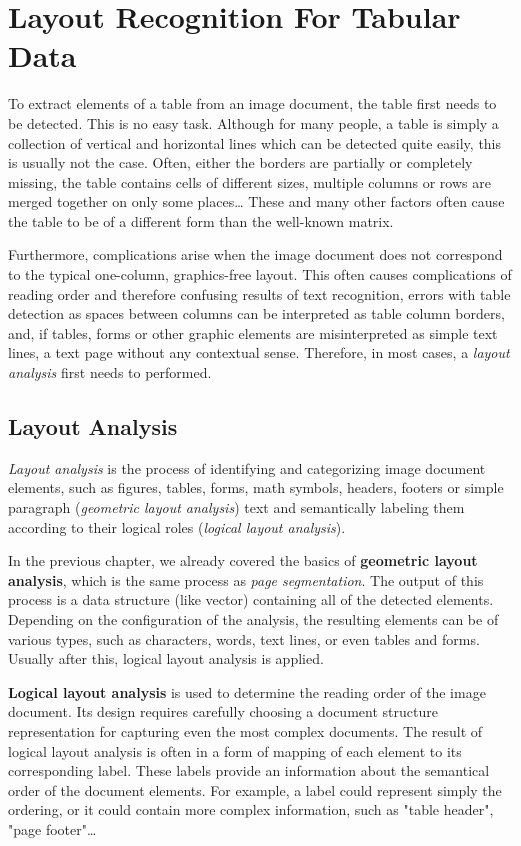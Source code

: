 \chapter{Layout Recognition For Tabular Data}

To extract elements of a table from an image document, the table first needs to be detected. This is no easy task.  Although for many people, a table is simply a collection of vertical and horizontal lines which can be detected quite easily, this is usually not the case. Often, either the borders are partially or completely missing, the table contains cells of different sizes, multiple columns or rows are merged together on only some places… These and many other factors often cause the table to be of a different form than the well-known matrix. 

Furthermore, complications arise when the image document does not correspond to the typical one-column, graphics-free layout. This often causes complications of reading order and therefore confusing results of text recognition, errors with table detection as spaces between columns can be interpreted as table column borders, and, if tables, forms or other graphic elements are misinterpreted as simple text lines, a text page without any contextual sense. Therefore, in most cases, a \emph{layout analysis} first needs to performed.

\section{Layout Analysis}

\emph{Layout analysis} is the process of identifying and categorizing image document elements, such as figures, tables, forms, math symbols, headers, footers or simple paragraph (\emph{geometric layout analysis}) text and semantically labeling them according to their logical roles (\emph{logical layout analysis}).

In the previous chapter, we already covered the basics of \textbf{geometric layout analysis}, which is the same process as \emph{page segmentation}. The output of this process is a data structure (like vector) containing all of the detected elements. Depending on the configuration of the analysis, the resulting elements can be of various types, such as characters, words, text lines, or even tables and forms. Usually after this, logical layout analysis is applied.

\textbf{Logical layout analysis }is used to determine the reading order of the image document. Its design requires carefully choosing a document structure representation for capturing even the most complex documents. The result of logical layout analysis is often in a form of mapping of each element to its corresponding label. These labels provide an information about the semantical order of the document elements. For example, a label could represent simply the ordering, or it could contain more complex information, such as "table header", "page footer"\ldots

